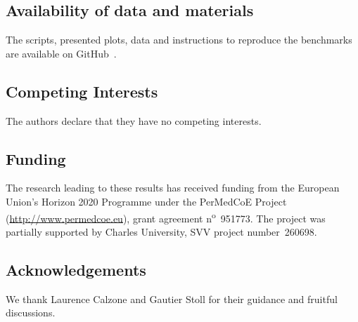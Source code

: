 \documentclass[sn-mathphys-num]{sn-jnl}%
\begin{document}
\subsection*{Availability of data and materials}

The scripts, presented plots, data and instructions to reproduce the benchmarks are available on GitHub~\cite{adam_smelko_2024_10853153}.

\subsection*{Competing Interests}
The authors declare that they have no competing interests.

\subsection*{Funding}
The research leading to these results has received funding from the European Union's Horizon 2020 Programme under the PerMedCoE Project (\url{http://www.permedcoe.eu}), grant agreement n\textsuperscript{o}~951773.
The project was partially supported by Charles University, SVV project number~260698.

\subsection*{Acknowledgements}
We thank Laurence Calzone and Gautier Stoll for their guidance and fruitful discussions.






\end{document}
